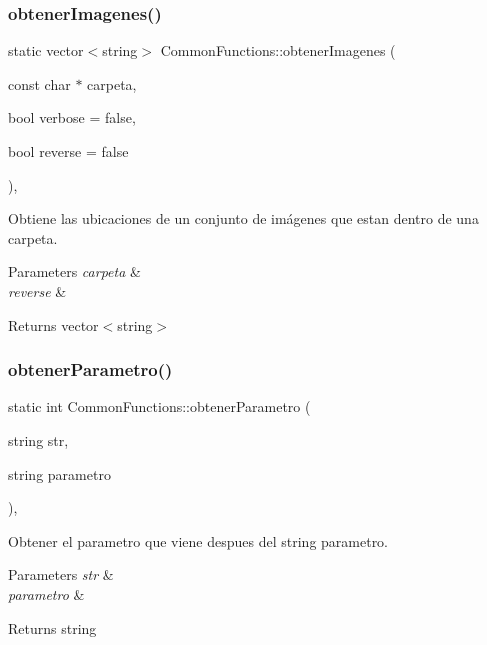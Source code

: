 \subsubsection{\texorpdfstring{obtener\+Imagenes()}{obtenerImagenes()}}
{\footnotesize\ttfamily static vector$<$string$>$ Common\+Functions\+::obtener\+Imagenes (\begin{DoxyParamCaption}\item[{const char $\ast$}]{carpeta,  }\item[{bool}]{verbose = {\ttfamily false},  }\item[{bool}]{reverse = {\ttfamily false} }\end{DoxyParamCaption})\hspace{0.3cm}{\ttfamily [inline]}, {\ttfamily [static]}}



Obtiene las ubicaciones de un conjunto de imágenes que estan dentro de una carpeta. 


\begin{DoxyParams}{Parameters}
{\em carpeta} & \\
\hline
{\em reverse} & \\
\hline
\end{DoxyParams}
\begin{DoxyReturn}{Returns}
vector$<$string$>$ 
\end{DoxyReturn}
\mbox{\label{classCommonFunctions_adb7c245caab42a6dc8f484527dd2d447}} 
\subsubsection{\texorpdfstring{obtener\+Parametro()}{obtenerParametro()}}
{\footnotesize\ttfamily static int Common\+Functions\+::obtener\+Parametro (\begin{DoxyParamCaption}\item[{string}]{str,  }\item[{string}]{parametro }\end{DoxyParamCaption})\hspace{0.3cm}{\ttfamily [inline]}, {\ttfamily [static]}}



Obtener el parametro que viene despues del string parametro. 


\begin{DoxyParams}{Parameters}
{\em str} & \\
\hline
{\em parametro} & \\
\hline
\end{DoxyParams}
\begin{DoxyReturn}{Returns}
string 
\end{DoxyReturn}
\mbox{\label{classCommonFunctions_a9b3747c4d4a2bc6d897ba1ae2ec59f00}} 
